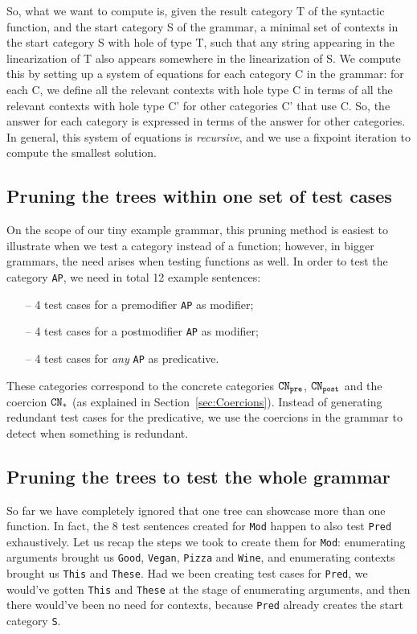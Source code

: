 \documentclass[11pt]{article}
\def\t#1{\texttt{#1}}
\newcommand{\kind}[1]{${\tt CN_{#1}}$}
\begin{document}
So, what we want to compute is, given the result category T of the syntactic function, and the start category S of the grammar, a minimal set of contexts in the start category S with hole of type T, such that any string appearing in the linearization of T also appears somewhere in the linearization of S. We compute this by setting up a system of equations for each category C in the grammar: for each C, we define all the relevant contexts with hole type C in terms of all the relevant contexts with hole type C' for other categories C' that use C. So, the answer for each category is expressed in terms of the answer for other categories. In general, this system of equations is \emph{recursive}, and we use a fixpoint iteration to compute the smallest solution.

\subsection{Pruning the trees within one set of test cases} 
On the scope of our tiny example grammar, this pruning method is
easiest to illustrate when we test a category instead of a function;
however, in bigger grammars, the need arises when testing functions as
well. 
In order to test the category \t{AP}, we need in total 12 example sentences:
\begin{itemize}
\setlength\itemsep{0em}
\item[--] 4 test cases for a premodifier \t{AP} as modifier;
\item[--] 4 test cases for a postmodifier \t{AP} as modifier;
\item[--] 4 test cases for \emph{any} \t{AP} as predicative.
\end{itemize}
These categories correspond to the concrete categories \kind{pre},
\kind{post} and the coercion \kind{*} (as explained in
Section~\ref{sec:Coercions}). Instead of generating redundant test
cases for the predicative, we use the coercions in the grammar to
detect when something is redundant.

\subsection{Pruning the trees to test the whole grammar}
\label{sec:pruning_all}
So far we have completely ignored that one tree can showcase more
than one function. In fact, the 8 test sentences created for \t{Mod}
happen to also test \t{Pred} exhaustively.
Let us recap the steps we took to create them for \t{Mod}:
enumerating arguments brought us \t{Good}, \t{Vegan}, \t{Pizza} and
\t{Wine}, and enumerating contexts brought us \t{This} and
\t{These}. Had we been creating test cases for \t{Pred}, we would've
gotten \t{This} and \t{These} at the stage of enumerating arguments,
and then there would've been no need for contexts, because \t{Pred}
already creates the start category \t{S}.
\end{document}
